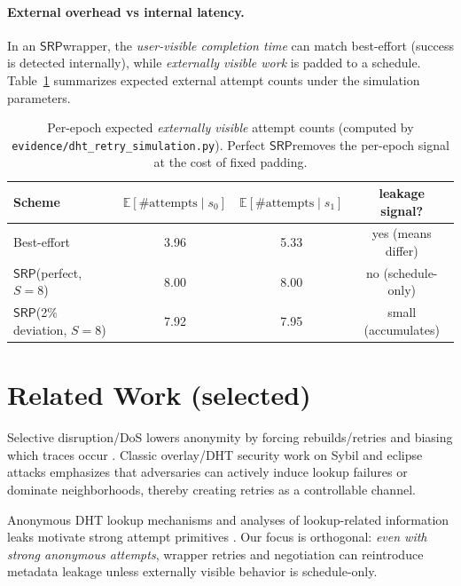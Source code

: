 \documentclass[11pt]{article}
\newcommand{\SRP}{\ensuremath{\mathsf{SRP}}}
\begin{document}
\paragraph{External overhead vs internal latency.}
In an \SRP wrapper, the \emph{user-visible completion time} can match best-effort (success is detected internally),
while \emph{externally visible work} is padded to a schedule.
Table~\ref{tab:overhead} summarizes expected external attempt counts under the simulation parameters.

\begin{table}[t]
\centering
\begin{tabular}{@{}lccc@{}}
\toprule
Scheme & $\mathbb{E}[\#\text{attempts}\mid s_0]$ & $\mathbb{E}[\#\text{attempts}\mid s_1]$ & leakage signal? \\
\midrule
Best-effort & 3.96 & 5.33 & yes (means differ) \\
\SRP (perfect, $S{=}8$) & 8.00 & 8.00 & no (schedule-only) \\
\SRP (2\% deviation, $S{=}8$) & 7.92 & 7.95 & small (accumulates) \\
\bottomrule
\end{tabular}
\caption{Per-epoch expected \emph{externally visible} attempt counts (computed by \texttt{evidence/dht\_retry\_simulation.py}). Perfect \SRP removes the per-epoch signal at the cost of fixed padding.}
\label{tab:overhead}
\end{table}

\section{Related Work (selected)}
Selective disruption/DoS lowers anonymity by forcing rebuilds/retries and biasing which traces occur
\cite{bauerLowResource2007,borisovDanezisMittalCCS2007,dasborisovSelectiveDoS2013,dannerDetectDoSTor2009,jansenPointBreak2019}.
Classic overlay/DHT security work on Sybil and eclipse attacks emphasizes that adversaries can actively induce lookup failures or dominate neighborhoods, thereby creating retries as a controllable channel.\cite{singhEclipseInfocom2006,baumgartSKademlia2007}

Anonymous DHT lookup mechanisms and analyses of lookup-related information leaks motivate strong attempt primitives
\cite{salsaNambiarSOSP2006,mittalInfoLeaksTISSEC2010,wangborisovLookupCCS2010,wangborisovOctopus2012}.
Our focus is orthogonal: \emph{even with strong anonymous attempts}, wrapper retries and negotiation can reintroduce metadata leakage unless externally visible behavior is schedule-only.
\end{document}
